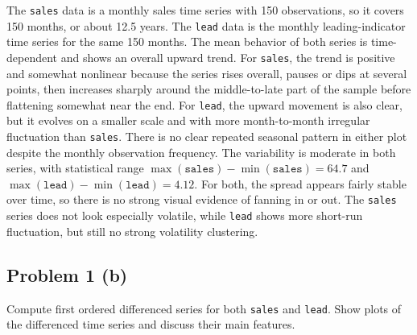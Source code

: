 \documentclass[
  10pt,
]{extarticle}
\begin{document}
The \texttt{sales} data is a monthly sales time series with 150 observations, so it covers 150 months, or about 12.5 years. The \texttt{lead} data is the monthly leading-indicator time series for the same 150 months. The mean behavior of both series is time-dependent and shows an overall upward trend. For \texttt{sales}, the trend is positive and somewhat nonlinear because the series rises overall, pauses or dips at several points, then increases sharply around the middle-to-late part of the sample before flattening somewhat near the end. For \texttt{lead}, the upward movement is also clear, but it evolves on a smaller scale and with more month-to-month irregular fluctuation than \texttt{sales}. There is no clear repeated seasonal pattern in either plot despite the monthly observation frequency. The variability is moderate in both series, with statistical range \(\max(\texttt{sales})-\min(\texttt{sales}) = 64.7\) and \(\max(\texttt{lead})-\min(\texttt{lead}) = 4.12\). For both, the spread appears fairly stable over time, so there is no strong visual evidence of fanning in or out. The \texttt{sales} series does not look especially volatile, while \texttt{lead} shows more short-run fluctuation, but still no strong volatility clustering.

\newpage

\subsection{Problem 1 (b)}\label{problem-1-b}

\begin{problem}[Problem 1 (b)]
Compute first ordered differenced series for both \texttt{sales} and \texttt{lead}. Show plots of the differenced time series and discuss their main features.
\end{problem}
\end{document}
